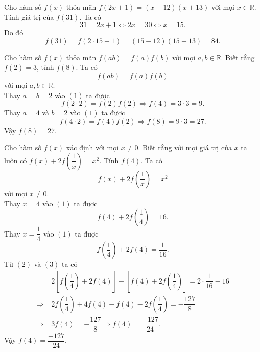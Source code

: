 \begin{vn}
Cho hàm số $f(x)$ thỏa mãn $f(2x+1)=(x-12)(x+13)$ với mọi $x\in\mathbb{R}$. Tính giá trị của $f(31)$.
\loigiai
{
Ta có \[31=2x+1\Leftrightarrow 2x=30\Leftrightarrow x=15.\]
Do đó \[f(31)=f(2\cdot 15+1)=\left(15-12\right)\left(15+13\right)=84.\]
}
\end{vn}
\begin{vn}
Cho hàm số $f(x)$ thỏa mãn $f(ab)=f(a)f(b)$ với mọi $a,b\in\mathbb{R}$. Biết rằng $f(2)=3$, tính $f(8)$.
\loigiai
{
Ta có \[f(ab)=f(a)f(b)\tag{1}\] với mọi $a,b\in\mathbb{R}$.\\
Thay $a=b=2$ vào $(1)$ ta được \[f(2\cdot 2)=f(2)f(2)\Rightarrow f(4)=3\cdot 3=9.\]
Thay $a=4$ và $b=2$ vào $(1)$ ta được \[f(4\cdot 2)=f(4)f(2)\Rightarrow f(8)=9\cdot 3=27.\]
Vậy $f(8)=27$.
}
\end{vn}
\begin{vn}
Cho hàm số $f(x)$ xác định với mọi $x\ne 0$. Biết rằng với mọi giá trị của $x$ ta luôn có $f(x)+2f\left(\dfrac{1}{x}\right)=x^2.$ Tính $f(4)$.
\loigiai
{
Ta có \[f(x)+2f\left(\dfrac{1}{x}\right)=x^2\tag{1}\]
với mọi $x\ne 0$.\\
Thay $x=4$ vào $(1)$ ta được
\[f(4)+2f\left(\dfrac{1}{4}\right)=16.\tag{2}\]
Thay $x=\dfrac{1}{4}$ vào $(1)$ ta được
\[f\left(\dfrac{1}{4}\right)+2f\left(4\right)=\dfrac{1}{16}.\tag{3}\]
Từ $(2)$ và $(3)$ ta có
\begin{align*}
&2\left[f\left(\dfrac{1}{4}\right)+2f(4)\right]-\left[f(4)+2f\left(\dfrac{1}{4}\right)\right]=2\cdot\dfrac{1}{16}-16\\ 
\Rightarrow\;&2f\left(\dfrac{1}{4}\right)+4f(4)-f(4)-2f\left(\dfrac{1}{4}\right)=-\dfrac{127}{8}\\
\Rightarrow\;&3f(4)=-\dfrac{127}{8}\Rightarrow f(4)=\dfrac{-127}{24}.
\end{align*}
Vậy $f(4)=\dfrac{-127}{24}$.
}
\end{vn}

